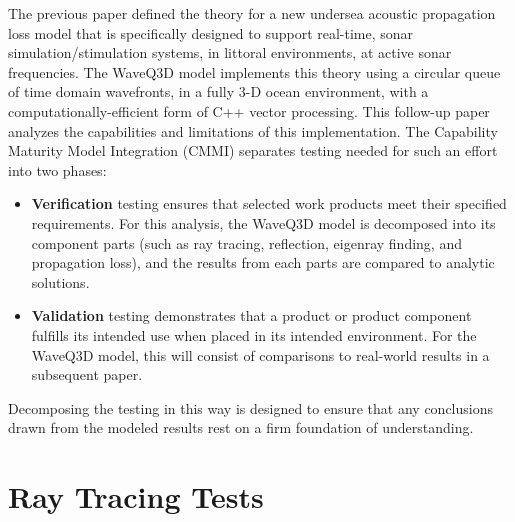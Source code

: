 \documentclass{ws-jca}
\begin{document}
The previous paper\cite{Reilly2012} defined the theory for a new undersea
acoustic propagation loss model that is specifically designed to support
real-time, sonar simulation/stimulation systems, in littoral environments,
at active sonar frequencies. The WaveQ3D model implements this theory using
a circular queue of time domain wavefronts, in a fully 3-D ocean
environment, with a computationally-efficient form of C++ vector
processing.\cite{Veldhuizen1995} This follow-up paper analyzes the
capabilities and limitations of this implementation. The Capability
Maturity Model Integration (CMMI)\cite{Chrissis2007} separates testing
needed for such an effort into two phases:
\begin{itemize}
\item {\bf Verification} testing ensures that selected work products meet
their specified requirements. For this analysis, the WaveQ3D model is
decomposed into its component parts (such as ray tracing, reflection,
eigenray finding, and propagation loss), and the results from each parts
are compared to analytic solutions.
\item {\bf Validation} testing demonstrates that a product or product
component fulfills its intended use when placed in its intended
environment. For the WaveQ3D model, this will consist of comparisons to
real-world results in a subsequent paper.
\end{itemize}
Decomposing the testing in this way is designed to ensure that any
conclusions drawn from the modeled results rest on a firm foundation of
understanding.

\section{Ray Tracing Tests}
\end{document}

